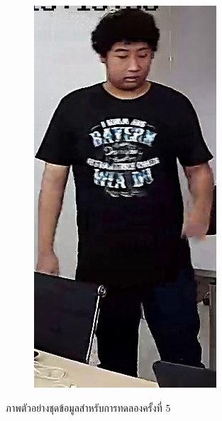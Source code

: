 \begin{figure}[!ht]
    \begin{subfigure}[b]{0.1\textwidth}
        \centering
        \includegraphics[width=\textwidth]{chapter4/images/o_3.jpg}
        \label{fig:ex_6}
    \end{subfigure}
    \caption{ภาพตัวอย่างชุดข้อมูลสำหรับการทดลองครั้งที่ 5}
    \label{fig: ภาพตัวอย่างชุดข้อมูลสำหรับการทดลอง 5}
\end{figure}
